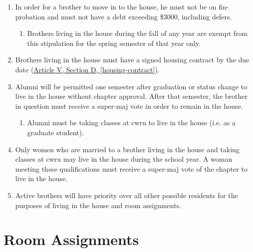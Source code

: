 \begin{enumerate}
		\item In order for a brother to move in to the house, he must not be on \gls{fin-probation} and must not have a debt exceeding \$3000, including \glspl{defer}.
        \begin{enumerate}
            \item Brothers living in the house during the fall of any year are exempt from this stipulation for the spring semester of that year only.
        \end{enumerate}

		\item Brothers living in the house must have a signed housing contract by the due date (\hyperref[housing-contract]{Article V, Section D, \autoref*{housing-contract}}). 

		\item Alumni will be permitted one semester after graduation or status change to live in the house without chapter approval. After that semester, the brother in question must receive a \gls{super-maj} vote in order to remain in the house. %
			\begin{enumerate}
				\item Alumni must be taking classes at \gls{cwru} to live in the house (i.e. as a graduate student).
			\end{enumerate}

		\item Only women who are married to a brother living in the house and taking classes at \gls{cwru} may live in the house during the school year. A woman meeting these qualifications must receive a \gls{super-maj} vote of the chapter to live in the house.

		\item Active brothers will have priority over all other possible residents for the purposes of living in the house and room assignments.

	\end{enumerate}

\section{Room Assignments}
\label{housing}

